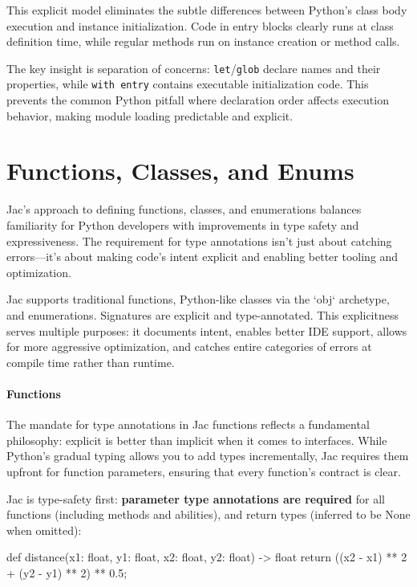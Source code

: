 This explicit model eliminates the subtle differences between Python's class body execution and instance initialization. Code in entry blocks clearly runs at class definition time, while regular methods run on instance creation or method calls.

The key insight is separation of concerns: \verb|let|/\verb|glob| declare names and their properties, while \verb|with entry| contains executable initialization code. This prevents the common Python pitfall where declaration order affects execution behavior, making module loading predictable and explicit.

\section{Functions, Classes, and Enums}

Jac's approach to defining functions, classes, and enumerations balances familiarity for Python developers with improvements in type safety and expressiveness. The requirement for type annotations isn't just about catching errors—it's about making code's intent explicit and enabling better tooling and optimization.

Jac supports traditional functions, Python-like classes via the `obj` archetype, and enumerations. Signatures are explicit and type-annotated. This explicitness serves multiple purposes: it documents intent, enables better IDE support, allows for more aggressive optimization, and catches entire categories of errors at compile time rather than runtime.

\paragraph{Functions}

The mandate for type annotations in Jac functions reflects a fundamental philosophy: explicit is better than implicit when it comes to interfaces. While Python's gradual typing allows you to add types incrementally, Jac requires them upfront for function parameters, ensuring that every function's contract is clear.

Jac is type-safety first: \textbf{parameter type annotations are required} for all functions (including methods and abilities), and return types (inferred to be None when omitted):

\begin{jacblock}
def distance(x1: float, y1: float, x2: float, y2: float) -> float {
    return ((x2 - x1) ** 2 + (y2 - y1) ** 2) ** 0.5;
}
\end{jacblock}

